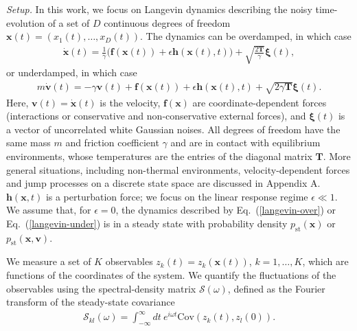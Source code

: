 \documentclass[aps,pre,twocolumn,superscriptaddress,notitlepage]{revtex4-2}
\newcommand{\bmc}[1]{\bm{\mathcal{#1}}}
\renewcommand{\eqref}[1]{Eq.~(\ref{#1})}
\begin{document}
\textit{Setup.}
In this work, we focus on Langevin dynamics \cite{Risken1986,Coffey2017} describing the noisy time-evolution of a set of $D$ continuous degrees of freedom $\bm{x}(t) = (x_1(t),\ldots,x_D(t))$.
The dynamics can be overdamped, in which case
\begin{align}
\dot{\bm{x}}(t) = \frac{1}{\gamma} \big(\bm{f}(\bm{x}(t)) + \epsilon \bm{h}(\bm{x}(t),t) \big) + \sqrt{\frac{2 \bm{T}}{\gamma}} \bm{\xi}(t) \label{langevin-over},
\end{align}
or underdamped, in which case
\begin{align}
m \dot{\bm{v}}(t) = - \gamma \bm{v}(t) + \bm{f}(\bm{x}(t)) + \epsilon \bm{h}(\bm{x}(t),t) + \sqrt{2 \gamma \bm{T}} \bm{\xi}(t) \label{langevin-under}.
\end{align}
Here, $\bm{v}(t) = \dot{\bm{x}}(t)$ is the velocity, $\bm{f}(\bm{x})$ are coordinate-dependent forces (interactions or conservative and non-conservative external forces), and $\bm{\xi}(t)$ is a vector of uncorrelated white Gaussian noises.
All degrees of freedom have the same mass $m$ and friction coefficient $\gamma$ and are in contact with equilibrium environments, whose temperatures are the entries of the diagonal matrix $\bm{T}$.
More general situations, including non-thermal environments, velocity-dependent forces and jump processes on a discrete state space are discussed in Appendix A.
$\bm{h}(\bm{x},t)$ is a perturbation force; we focus on the linear response regime $\epsilon \ll 1$.
We assume that, for $\epsilon = 0$, the dynamics described by \eqref{langevin-over} or \eqref{langevin-under} is in a steady state with probability density $p_\text{st}(\bm{x})$ or $p_\text{st}(\bm{x},\bm{v})$.

We measure a set of $K$ observables $z_k(t) = z_k(\bm{x}(t))$, $k = 1,\ldots,K$, which are functions of the coordinates of the system.
We quantify the fluctuations of the observables using the spectral-density matrix $\bmc{S}(\omega)$, defined as the Fourier transform of the steady-state covariance \cite{Stratonovich1963}
\begin{align}
\mathcal{S}_{kl}(\omega) = \int_{-\infty}^\infty dt \ e^{i \omega t} \text{Cov}(z_k(t),z_l(0)) \label{psd} .
\end{align}
\end{document}
